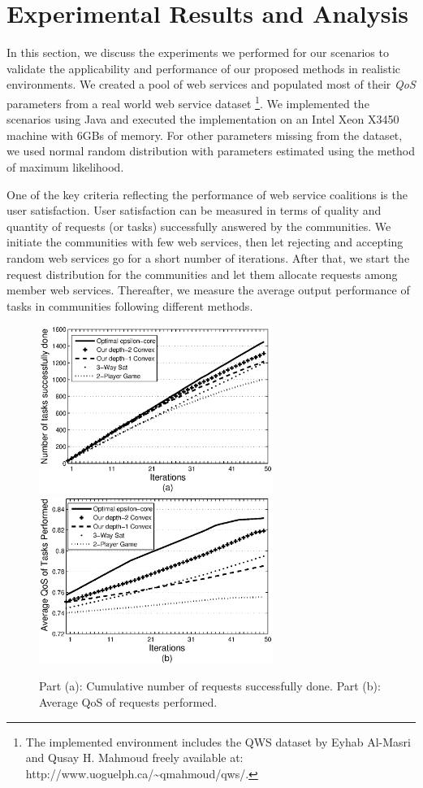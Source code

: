 \documentclass[10pt,journal,cspaper,compsoc]{IEEEtran}
\begin{document}
\section{Experimental Results and Analysis}\label{s:resutls}

In this section, we discuss the experiments we performed for our
scenarios to validate the applicability and performance of our
proposed methods in realistic environments. We created a pool of
web services and populated most of their \emph{QoS} parameters
from a real world web service dataset
\cite{DBLP:conf/smc/Al-MasriM09a}\footnote[1]{The implemented 
environment includes the QWS dataset by Eyhab Al-Masri and Qusay H. Mahmoud 
freely available at: http://www.uoguelph.ca/\textasciitilde{}qmahmoud/qws/.}. We implemented the scenarios
using Java and executed the implementation on an Intel Xeon X3450
machine with 6GBs of memory. For other parameters missing from the
dataset, we used normal random distribution with parameters
estimated using the method of maximum likelihood.

One of the key criteria reflecting the performance of web service
coalitions is the user satisfaction. User satisfaction can be
measured in terms of quality and quantity of requests (or tasks)
successfully answered by the communities. We initiate the
communities with few web services, then let rejecting and
accepting random web services go for a short number of iterations.
After that, we start the request distribution for the communities
and let them allocate requests among member web services.
Thereafter, we measure the average output performance of tasks in
communities following different methods.

\begin{figure}[!t]
\centering
\includegraphics[width=3in]{task_done_opt.eps}
\includegraphics[width=3in]{task_qos_opt.eps}
\caption{Part (a): Cumulative number of requests successfully
done. Part (b): Average QoS of requests performed.}
\label{performanceall}
\end{figure}
\end{document}
